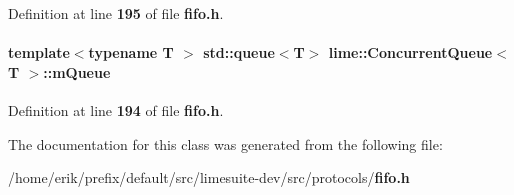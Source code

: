 Definition at line {\bf 195} of file {\bf fifo.\+h}.

\paragraph[{m\+Queue}]{\setlength{\rightskip}{0pt plus 5cm}template$<$typename T $>$ std\+::queue$<$T$>$ {\bf lime\+::\+Concurrent\+Queue}$<$ T $>$\+::m\+Queue\hspace{0.3cm}{\ttfamily [private]}}\label{classlime_1_1ConcurrentQueue_a57ebc78170c2fdf4658d46b5ed302e08}


Definition at line {\bf 194} of file {\bf fifo.\+h}.



The documentation for this class was generated from the following file\+:\begin{DoxyCompactItemize}
\item 
/home/erik/prefix/default/src/limesuite-\/dev/src/protocols/{\bf fifo.\+h}\end{DoxyCompactItemize}

